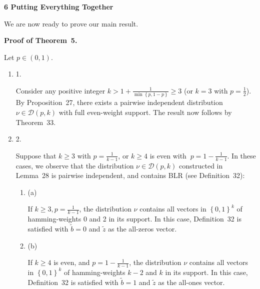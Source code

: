 \par\medskip\noindent\textbf{
6 Putting Everything Together}\par




We are now ready to prove our main result.\par




\par\medskip\noindent\textbf{Proof of Theorem 5.}\par




Let $p\in(0,1)$.\par




\begin{enumerate}


\item[] 
1. 


Consider any positive integer $k>1+\frac{1}{\min\left\{p,1-p\right\}}\geqslant 3$ (or $k=3$ with $p=\frac{1}{2}$).
By Proposition 27, there exists a pairwise independent distribution $\nu\in\mathcal{D}(p,k)$ with full even-weight support.
The result now follows by Theorem 33.\par





\item[] 
2. 


Suppose that $k\geqslant 3$ with $p=\frac{1}{k-1}$, or $k\geqslant 4$ is even with $\ p=1-\frac{1}{k-1}$.
In these cases, we observe that the distribution $\nu\in\mathcal{D}(p,k)$ constructed in Lemma 28 is pairwise independent, and contains BLR (see Definition 32):\par


\begin{enumerate}


\item[] 
(a) 


If $k\geqslant 3,p=\frac{1}{k-1}$, the distribution $\nu$ contains all vectors in $\left\{0,1\right\}^{k}$ of hamming-weights 0 and 2 in its support. In this case, Definition 32 is satisfied with $\tilde{b}=0$ and $\tilde{z}$ as the all-zeros vector.\par





\item[] 
(b) 


If $k\geqslant 4$ is even, and $p=1-\frac{1}{k-1}$, the distribution $\nu$ contains all vectors in $\left\{0,1\right\}^{k}$ of hamming-weights $k-2$ and $k$ in its support. In this case, Definition 32 is satisfied with $\tilde{b}=1$ and $\tilde{z}$ as the all-ones vector.\par






\end{enumerate}
\end{enumerate}
